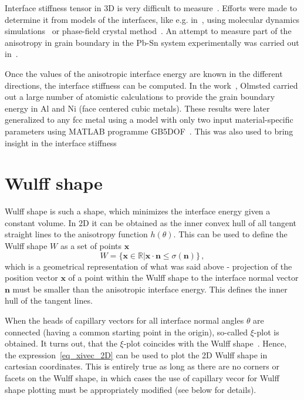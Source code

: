 Interface stiffness tensor in 3D is very difficult to measure~\cite{Du2007}. Efforts were made to determine it from models of the interfaces, like e.g. in~\cite{Du2007}, using molecular dynamics simulations~\cite{Trautt2005,Abdeljawad2018} or phase-field crystal method~\cite{Blixt2022}. An attempt to measure part of the anisotropy in grain boundary in the Pb-Sn system experimentally was carried out in~\cite{Rowenhorst2005}. 

Once the values of the anisotropic interface energy are known in the different directions, the interface stiffness can be computed. In the work~\cite{Olmsted2009}, Olmsted carried out a large number of atomistic calculations to provide the grain boundary energy in Al and Ni (face centered cubic metals). These results were later generalized to any fcc metal using a model with only two input material-specific parameters using MATLAB programme GB5DOF~\cite{Bulatov2014}. This was also used to bring insight in the interface stiffness~\cite{Moore2021}

\section{Wulff shape}
Wulff shape is such a shape, which minimizes the interface energy given a constant volume. In 2D it can be obtained as the inner convex hull of all tangent straight lines to the anisotropy function $h(\theta)$. This can be used to define the Wulff shape $W$ as a set of points $\bm{x}$~\cite{Kobayashi2001, Eggleston2001, Salvalaglio2015}
\begin{equation}
    W = \{ \bm{x}\in\mathbb{R}| \bm{x}\cdot\bm{n}\leq \sigma(\bm{n})\} \,,
\end{equation}
which is a geometrical representation of what was said above - projection of the position vector $\bm{x}$ of a point within the Wulff shape to the interface normal vector $\bm{n}$ must be smaller than the anisotropic interface energy. This defines the inner hull of the tangent lines.

When the heads of capillary vectors for all interface normal angles $\theta$ are connected (having a common starting point in the origin), so-called $\xi$-plot is obtained. It turns out, that the $\xi$-plot coincides with the Wulff shape~\cite{Hoffman1972, Kobayashi2001}. Hence, the expression~\eqref{eq_xivec_2D} can be used to plot the 2D Wulff shape in cartesian coordinates. This is entirely true as long as there are no corners or facets on the Wulff shape, in which cases the use of capillary vecor for Wulff shape plotting must be appropriately modified (see below for details).

